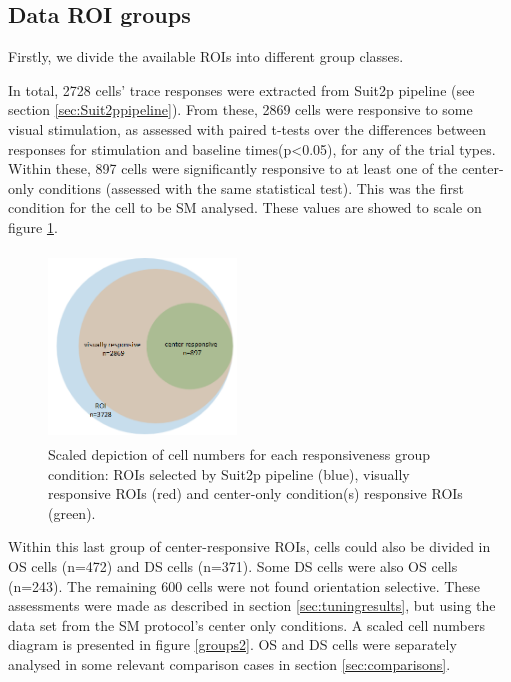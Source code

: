 \subsection{Data ROI groups}

Firstly, we divide the available ROIs into different group classes.

In total, 2728 cells' trace responses were extracted from Suit2p pipeline (see section \ref{sec:Suit2ppipeline}).  From these, 2869 cells were responsive to some visual stimulation, as assessed with paired t-tests over the differences between responses for stimulation and baseline times(p<0.05), for any of the trial types. Within these, 897 cells were significantly responsive to at least one of the center-only conditions (assessed with the same statistical test). This was the first condition for the cell to be SM analysed. These values are showed to scale on figure \ref{groups1}.

\begin{figure}[H] \centering \includegraphics[width=5cm,height=5cm,keepaspectratio]{Figures/7.Results/data/ROIvisualCenter.png} 
\caption{Scaled depiction of cell numbers for each responsiveness group condition: ROIs selected by Suit2p pipeline (blue), visually responsive ROIs (red) and center-only condition(s) responsive ROIs (green).}
\label{groups1}
\end{figure}

Within this last group of center-responsive ROIs, cells could also be divided in OS cells (n=472) and DS cells (n=371). Some DS cells were also OS cells (n=243). The remaining 600 cells were not found orientation selective. These assessments were made as described in section \ref{sec:tuningresults}, but using the data set from the SM protocol's center only conditions. A scaled cell numbers diagram is presented in figure \ref{groups2}.
OS and DS cells were separately analysed in some relevant comparison cases in section \ref{sec:comparisons}.

